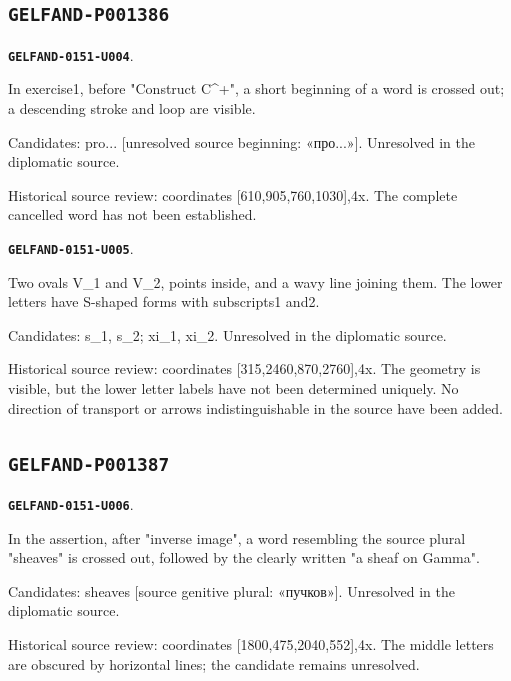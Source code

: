 \documentclass[11pt]{article}
\theoremstyle{definition}
\theoremstyle{remark}
\begin{document}
\subsection*{\texttt{GELFAND-P001386}}
\par\noindent\leavevmode{}\label{GELFAND-0151-U004}\label{GELFAND-P001386:cancelled-exercise:note}\textbf{\texttt{GELFAND-0151-U004}}.\nopagebreak[4]\par
In exercise1, before "Construct C\textasciicircum{}+", a short beginning of a word is crossed out; a descending stroke and loop are visible.\par
Candidates: pro... [unresolved source beginning: «про...»]. Unresolved in the diplomatic source.\par
Historical source review: coordinates [610,905,760,1030],4x. The complete cancelled word has not been established.\par\medskip
\par\noindent\leavevmode{}\label{GELFAND-0151-U005}\label{GELFAND-P001386:path-diagram:note}\textbf{\texttt{GELFAND-0151-U005}}.\nopagebreak[4]\par
Two ovals V\_1 and V\_2, points inside, and a wavy line joining them. The lower letters have S-shaped forms with subscripts1 and2.\par
Candidates: s\_1, s\_2; xi\_1, xi\_2. Unresolved in the diplomatic source.\par
Historical source review: coordinates [315,2460,870,2760],4x. The geometry is visible, but the lower letter labels have not been determined uniquely. No direction of transport or arrows indistinguishable in the source have been added.\par\medskip
\subsection*{\texttt{GELFAND-P001387}}
\par\noindent\leavevmode{}\label{GELFAND-0151-U006}\label{GELFAND-P001387:cancelled-pullback:note}\textbf{\texttt{GELFAND-0151-U006}}.\nopagebreak[4]\par
In the assertion, after "inverse image", a word resembling the source plural "sheaves" is crossed out, followed by the clearly written "a sheaf on Gamma".\par
Candidates: sheaves [source genitive plural: «пучков»]. Unresolved in the diplomatic source.\par
Historical source review: coordinates [1800,475,2040,552],4x. The middle letters are obscured by horizontal lines; the candidate remains unresolved.\par\medskip
\end{document}
